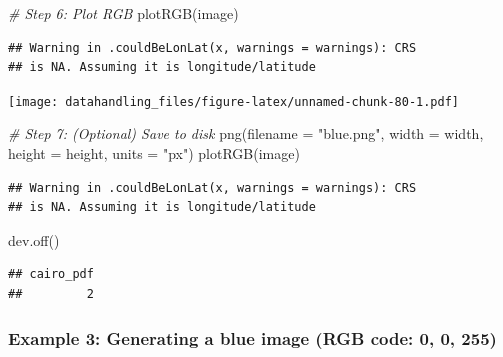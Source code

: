 \documentclass[
  12pt,
]{style/krantz}
\newenvironment{Shaded}{\begin{snugshade}}{\end{snugshade}}
\newcommand{\AttributeTok}[1]{\textcolor[rgb]{0.77,0.63,0.00}{#1}}
\newcommand{\CommentTok}[1]{\textcolor[rgb]{0.56,0.35,0.01}{\textit{#1}}}
\newcommand{\FunctionTok}[1]{\textcolor[rgb]{0.00,0.00,0.00}{#1}}
\newcommand{\NormalTok}[1]{#1}
\newcommand{\StringTok}[1]{\textcolor[rgb]{0.31,0.60,0.02}{#1}}
\begin{document}
\begin{Shaded}
\begin{Highlighting}[]
\CommentTok{\# Step 6: Plot RGB}
\FunctionTok{plotRGB}\NormalTok{(image)}
\end{Highlighting}
\end{Shaded}

\begin{verbatim}
## Warning in .couldBeLonLat(x, warnings = warnings): CRS
## is NA. Assuming it is longitude/latitude
\end{verbatim}

\texttt{[image: datahandling\_files/figure-latex/unnamed-chunk-80-1.pdf]}

\begin{Shaded}
\begin{Highlighting}[]
\CommentTok{\# Step 7: (Optional) Save to disk}
\FunctionTok{png}\NormalTok{(}\AttributeTok{filename =} \StringTok{"blue.png"}\NormalTok{, }\AttributeTok{width =}\NormalTok{ width, }\AttributeTok{height =}\NormalTok{ height, }\AttributeTok{units =} \StringTok{"px"}\NormalTok{)}
\FunctionTok{plotRGB}\NormalTok{(image)}
\end{Highlighting}
\end{Shaded}

\begin{verbatim}
## Warning in .couldBeLonLat(x, warnings = warnings): CRS
## is NA. Assuming it is longitude/latitude
\end{verbatim}

\begin{Shaded}
\begin{Highlighting}[]
\FunctionTok{dev.off}\NormalTok{()}
\end{Highlighting}
\end{Shaded}

\begin{verbatim}
## cairo_pdf 
##         2
\end{verbatim}

\hypertarget{example-3-generating-a-blue-image-rgb-code-0-0-255}{%
\subsubsection{Example 3: Generating a blue image (RGB code: 0, 0, 255)}\label{example-3-generating-a-blue-image-rgb-code-0-0-255}}
\end{document}
